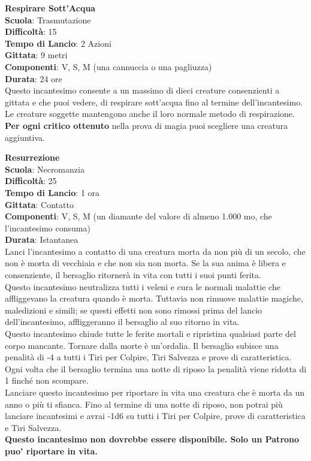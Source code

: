 \begin{multicols}{2}
\medskip\textbf{Respirare Sott’Acqua}\\
\textbf{Scuola}: Trasmutazione\\
\textbf{Difficoltà}:  15\\
\textbf{Tempo di Lancio}: 2 Azioni\\
\textbf{Gittata}: 9 metri\\
\textbf{Componenti}: V, S, M (una cannuccia o una pagliuzza)\\
\textbf{Durata}: 24 ore\\
Questo incantesimo consente a un massimo di dieci creature consenzienti a gittata e che puoi vedere, di respirare sott’acqua fino al termine dell'incantesimo. Le creature soggette mantengono anche il loro normale metodo di respirazione.\\
\textbf{Per ogni critico ottenuto} nella prova di magia puoi scegliere una creatura aggiuntiva.

\medskip\textbf{Resurrezione}\\
\textbf{Scuola}: Necromanzia\\
\textbf{Difficoltà}:  25\\
\textbf{Tempo di Lancio}: 1 ora\\
\textbf{Gittata}: Contatto\\
\textbf{Componenti}: V, S, M (un diamante del valore di almeno 1.000 mo, che l'incantesimo consuma)\\
\textbf{Durata}: Istantanea\\
Lanci l'incantesimo a contatto di una creatura morta da non più di un secolo, che non è morta di vecchiaia e che non sia non morta. Se la sua anima è libera e consenziente, il bersaglio ritornerà in vita con tutti i suoi punti ferita.\\
Questo incantesimo neutralizza tutti i veleni e cura le normali malattie che affliggevano la creatura quando è morta. Tuttavia non rimuove malattie magiche, maledizioni e simili; se questi effetti non sono rimossi prima del lancio dell'incantesimo, affliggeranno il bersaglio al suo ritorno in vita.\\
Questo incantesimo chiude tutte le ferite mortali e ripristina qualsiasi parte del corpo mancante. Tornare dalla morte è un'ordalia. Il bersaglio subisce una penalità di -4 a tutti i Tiri per Colpire, Tiri Salvezza e prove di caratteristica. Ogni volta che il bersaglio termina una notte di riposo la penalità viene ridotta di 1 finché non scompare.\\
Lanciare questo incantesimo per riportare in vita una creatura che è morta da un anno o più ti sfianca. Fino al termine di una notte di riposo, non potrai più lanciare incantesimi e avrai -1d6 su tutti i Tiri per Colpire, prove di caratteristica e Tiri Salvezza.\\
\textbf{Questo incantesimo non dovrebbe essere disponibile. Solo un Patrono puo' riportare in vita.}


\end{multicols}
